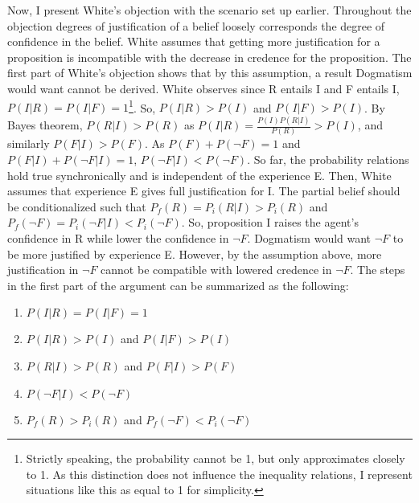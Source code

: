 Now, I present White's objection with the scenario set up earlier.
Throughout the objection degrees of justification of a belief loosely
corresponds the degree of confidence in the belief. White assumes that
getting more justification for a proposition is incompatible with the
decrease in credence for the proposition. The first part of White's
objection shows that by this assumption, a result Dogmatism would want
cannot be derived. White observes since R entails I and F entails I,
\(P(I|R) = P(I|F) = 1\)\footnote{Strictly speaking, the probability
  cannot be 1, but only approximates closely to 1. As this distinction
  does not influence the inequality relations, I represent situations
  like this as equal to 1 for simplicity.}. So, \(P(I|R) > P(I)\) and
\(P(I|F) > P(I)\). By Bayes theorem, \(P(R|I) > P(R)\) as
\(P(I|R) = \frac{P(I)P(R|I)}{P(R)} > P(I)\), and similarly
\(P(F|I) > P(F)\). As \(P(F) + P(\neg F) = 1\) and
\(P(F|I) + P(\neg F|I) = 1\), \(P(\neg F|I) < P(\neg F)\). So far, the
probability relations hold true synchronically and is independent of the
experience E. Then, White assumes that experience E gives full
justification for I. The partial belief should be conditionalized such
that \(P_{f}(R) = P_{i}(R|I) > P_{i}(R)\) and
\(P_{f}(\neg F) = P_{i}(\neg F|I) < P_{i}(\neg F)\). So, proposition I
raises the agent's confidence in R while lower the confidence in
\(\neg F\). Dogmatism would want \(\neg F\) to be more justified by
experience E. However, by the assumption above, more justification in
\(\neg F\) cannot be compatible with lowered credence in \(\neg F\). The
steps in the first part of the argument can be summarized as the
following:
\begin{enumerate}
	\item \(P(I|R) = P(I|F) = 1\)

	\item \(P(I|R) > P(I)\) and \(P(I|F) > P(I)\)

	\item \(P(R|I) > P(R)\) and \(P(F|I) > P(F)\)

	\item \(P(\neg F|I) < P(\neg F)\)

	\item \(P_{f}(R) > P_{i}(R)\) and \(P_{f}(\neg F) < P_{i}(\neg F)\)
\end{enumerate}

